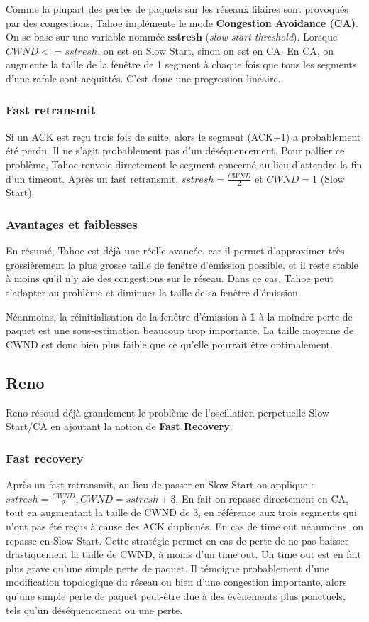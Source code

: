 \documentclass[	DIV=calc,%
							paper=a4,%
							fontsize=11pt,%
							twocolumn]{scrartcl}	 					%
\begin{document}
Comme la plupart des pertes de paquets sur les réseaux filaires sont provoqués par des congestions, Tahoe implémente le mode \textbf{Congestion Avoidance (CA)}. On se base sur une variable nommée \textbf{sstresh} (\textit{slow-start threshold}). Lorsque $CWND <= sstresh$, on est en Slow Start, sinon on est en CA. En CA, on augmente la taille de la fenêtre de 1 segment à chaque fois que tous les segments d'une rafale sont acquittés. C'est donc une progression linéaire.

\subsubsection*{Fast retransmit}
Si un ACK est reçu trois fois de suite, alors le segment (ACK+1) a probablement été perdu. Il ne s'agit probablement pas d'un déséquencement. Pour pallier ce problème, Tahoe renvoie directement le segment concerné au lieu d'attendre la fin d'un timeout. Après un fast retransmit, $sstresh=\frac{CWND}{2} $ et $ CWND=1$ (Slow Start).

\subsubsection*{Avantages et faiblesses}
En résumé, Tahoe est déjà une réelle avancée, car il permet d'approximer très grossièrement la plus grosse taille de fenêtre d'émission possible, et il reste stable à moins qu'il n'y aie des congestions sur le réseau. Dans ce cas, Tahoe peut s'adapter au problème et diminuer la taille de sa fenêtre d'émission.

Néanmoins, la réinitialisation de la fenêtre d'émission à \textbf{1} à la moindre perte de paquet est une sous-estimation beaucoup trop importante. La taille moyenne de CWND est donc bien plus faible que ce qu'elle pourrait être optimalement.


\subsection*{Reno}
Reno résoud déjà grandement le problème de l'oscillation perpetuelle Slow Start/CA en ajoutant la notion de \textbf{Fast Recovery}.

\subsubsection*{Fast recovery}
Après un fast retransmit, au lieu de passer en Slow Start on applique :
$ sstresh=\frac{CWND}{2}, CWND=sstresh+3$. En fait on repasse directement en CA, tout en augmentant la taille de CWND de 3, en référence aux trois segments qui n'ont pas été reçus à cause des ACK dupliqués. En cas de time out néanmoins, on repasse en Slow Start. Cette stratégie permet en cas de perte de ne pas baisser drastiquement la taille de CWND, à moins d'un time out. Un time out est en fait plus grave qu'une simple perte de paquet. Il témoigne probablement d'une modification topologique du réseau ou bien d'une congestion importante, alors qu'une simple perte de paquet peut-être due à des évènements plus ponctuels, tels qu'un déséquencement ou une perte.
\end{document}
